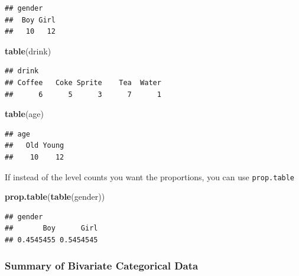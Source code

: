 \documentclass[]{book}
\newenvironment{Shaded}{\begin{snugshade}}{\end{snugshade}}
\newcommand{\KeywordTok}[1]{\textcolor[rgb]{0.13,0.29,0.53}{\textbf{#1}}}
\newcommand{\StringTok}[1]{\textcolor[rgb]{0.31,0.60,0.02}{#1}}
\newcommand{\CommentTok}[1]{\textcolor[rgb]{0.56,0.35,0.01}{\textit{#1}}}
\newcommand{\OperatorTok}[1]{\textcolor[rgb]{0.81,0.36,0.00}{\textbf{#1}}}
\newcommand{\NormalTok}[1]{#1}
\theoremstyle{definition}
\theoremstyle{definition}
\theoremstyle{definition}
\theoremstyle{remark}
\begin{document}
\begin{verbatim}
## gender
##  Boy Girl 
##   10   12
\end{verbatim}

\begin{Shaded}
\begin{Highlighting}[]
\KeywordTok{table}\NormalTok{(drink)}
\end{Highlighting}
\end{Shaded}

\begin{verbatim}
## drink
## Coffee   Coke Sprite    Tea  Water 
##      6      5      3      7      1
\end{verbatim}

\begin{Shaded}
\begin{Highlighting}[]
\KeywordTok{table}\NormalTok{(age)}
\end{Highlighting}
\end{Shaded}

\begin{verbatim}
## age
##   Old Young 
##    10    12
\end{verbatim}

If instead of the level counts you want the proportions, you can use
\texttt{prop.table}

\begin{Shaded}
\begin{Highlighting}[]
\KeywordTok{prop.table}\NormalTok{(}\KeywordTok{table}\NormalTok{(gender))}
\end{Highlighting}
\end{Shaded}

\begin{verbatim}
## gender
##       Boy      Girl 
## 0.4545455 0.5454545
\end{verbatim}

\subsubsection{Summary of Bivariate Categorical
Data}\label{summary-of-bivariate-categorical-data}

\begin{Shaded}
\end{Shaded}
\end{document}
